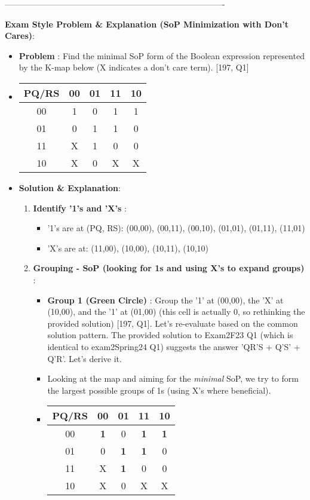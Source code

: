 \documentclass{article}
\begin{document}
\-------------------------------------------------------------------------------- 

\textbf{Exam Style Problem \& Explanation (SoP Minimization with Don't Cares)}:

\begin{itemize}
    \item \textbf{Problem} : Find the minimal SoP form of the Boolean expression represented by the K-map below (X indicates a don't care term). [197, Q1]
    \item \begin{tabular}{|c|c|c|c|c|} \\ \hline
PQ/RS & 00 & 01 & 11 & 10 \\ \hline
 00 & 1 & 0 & 1 & 1 \\ 01 & 0 & 1 & 1 & 0 \\ 11 & X & 1 & 0 & 0 \\ 10 & X & 0 & X & X \\ \hline

\end{tabular}

    \item \textbf{Solution \& Explanation}:
    \begin{enumerate}
        \item \textbf{Identify '1's and 'X's} :
        \begin{itemize}
            \item '1's are at (PQ, RS): (00,00), (00,11), (00,10), (01,01), (01,11), (11,01)
            \item 'X's are at: (11,00), (10,00), (10,11), (10,10)
        \end{itemize}
        \item \textbf{Grouping - SoP (looking for 1s and using X's to expand groups)} :
        \begin{itemize}
            \item \textbf{Group 1 (Green Circle)} : Group the '1' at (00,00), the 'X' at (10,00), and the '1' at (01,00) (this cell is actually 0, so rethinking the provided solution) [197, Q1]. Let's re-evaluate based on the common solution pattern. The provided solution to Exam2F23 Q1 (which is identical to exam2Spring24 Q1) suggests the answer 'QR'S + Q'S' + Q'R'. Let's derive it.
            \item Looking at the map and aiming for the \textit{minimal} SoP, we try to form the largest possible groups of 1s (using X's where beneficial).
            \item \begin{tabular}{|c|c|c|c|c|} \\ \hline
PQ/RS & 00 & 01 & 11 & 10 \\ \hline
 00 & \textbf{1} & 0 & \textbf{1} & \textbf{1} \\ 01 & 0 & \textbf{1} & \textbf{1} & 0 \\ 11 & X & \textbf{1} & 0 & 0 \\ 10 & X & 0 & X & X \\ \hline


\end{tabular}
\end{itemize}
\end{enumerate}
\end{itemize}
\end{document}
